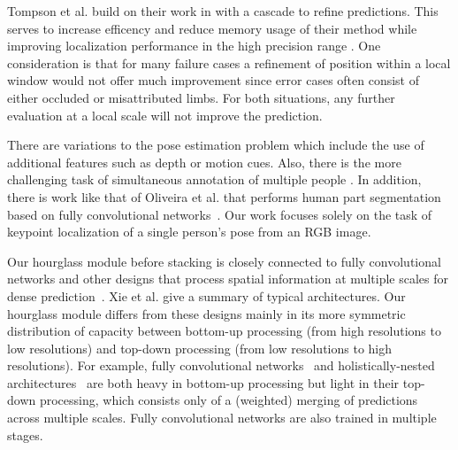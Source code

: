 \documentclass[runningheads]{llncs}
\begin{document}
Tompson et al. build on their work in \cite{tompson2014joint} with a
cascade to refine predictions. This serves to increase efficency and
reduce memory usage of their method while improving localization
performance in the high precision range \cite{tompson2015efficient}.
One consideration is that for many failure cases a refinement of
position within a local window would not offer much improvement since
error cases often consist of either occluded or misattributed
limbs. For both situations, any further evaluation at a local scale
will not improve the prediction.
 
There are variations to the pose estimation problem which include the
use of additional features such as depth or motion cues.
\cite{jain2014modeep, shotton2013depth, pfister2015flowing} Also,
there is the more challenging task of simultaneous annotation of
multiple people \cite{chen2015parsing, pish15deepcut}. In addition,
there is work like that of Oliveira et al. \cite{oliveira2016deep}
that performs human part segmentation based on fully convolutional
networks~\cite{long2015fully}. Our work focuses solely on the task
of keypoint localization of a single person's pose from an RGB image.

Our hourglass module before stacking is closely connected to fully
convolutional networks \cite{long2015fully} and other designs that
process spatial information at multiple scales for dense
prediction~\cite{tompson2014joint, xie2015holistically,
  eigen2014depth, farabet2013learning, pinheiro2014recurrent,
  eigen2015predicting, mathieu2015deep, couprie2013indoor,
  bertasius2015deepedge, hariharan2015hypercolumns}. Xie et
al. \cite{xie2015holistically} give a summary of typical
architectures. Our hourglass module differs from these designs mainly
in its more symmetric distribution of capacity between bottom-up
processing (from high resolutions to low resolutions) and top-down
processing (from low resolutions to high resolutions). For example,
fully convolutional networks~\cite{long2015fully} and
holistically-nested architectures~\cite{xie2015holistically} are both
heavy in bottom-up processing but light in their top-down processing,
which consists only of a (weighted) merging of predictions across
multiple scales. Fully convolutional networks are also trained in
multiple stages.
\end{document}

